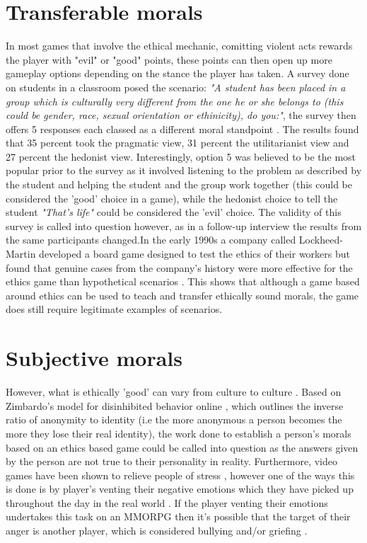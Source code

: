 \documentclass[12pt]{article}
\begin{document}
\section{Transferable morals}
In most games that involve the ethical mechanic, comitting violent acts rewards the player with "evil" or "good" points, these points can then open up more gameplay options depending on the stance the player has taken. A survey done on students in a classroom posed the scenario: \textit{"A student has been placed in a group which is culturally very different from the one he or she belongs to (this could be gender, race, sexual orientation or ethinicity), do you:"}, the survey then offers 5 responses each classed as a different moral standpoint \cite{7942917}. The results found that 35 percent took the pragmatic view, 31 percent the utilitarianist view and 27 percent the hedonist view. Interestingly, option 5 was believed to be the most popular prior to the survey as it involved listening to the problem as described by the student and helping the student and the group work together (this could be considered the 'good' choice in a game), while the hedonist choice to tell the student \textit{"That's life"} could be considered the 'evil' choice. The validity of this survey is called into question however, as in a follow-up interview the results from the same participants changed.In the early 1990s a company called Lockheed-Martin developed a board game designed to test the ethics of their workers but found that genuine cases from the company's history were more effective for the ethics game than hypothetical scenarios \cite{4408567}. This shows that although a game based around ethics can be used to teach and transfer ethically sound morals, the game does still require legitimate examples of scenarios.

\section{Subjective morals}
However, what is ethically 'good' can vary from culture to culture \cite{7426669}. Based on Zimbardo's model for disinhibited behavior online \cite{Zim}, which outlines the inverse ratio of anonymity to identity (i.e the more anonymous a person becomes the more they lose their real identity), the work done to establish a person's morals based on an ethics based game could be called into question as the answers given by the person are not true to their personality in reality. Furthermore, video games have been shown to relieve people of stress \cite{7539750}, however one of the ways this is done is by player's venting their negative emotions which they have picked up throughout the day in the real world \cite{6701985}. If the player venting their emotions undertakes this task on an MMORPG then it's possible that the target of their anger is another player, which is considered bullying and/or griefing \cite{coyne2009griefing}.
\end{document}
